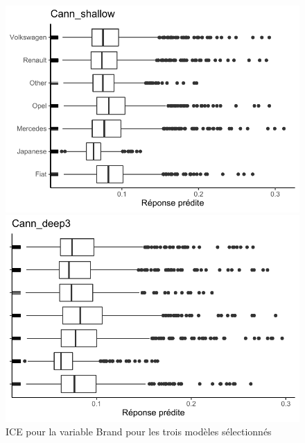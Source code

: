 \begin{figure}[b]
\begin{minipage}{0.45\linewidth}
\end{minipage}
\end{figure}

\begin{figure}[b]
\caption{\label{fig:ice3Brand} ICE pour la variable Brand pour les trois modèles sélectionnés}
\centering
\begin{minipage}{0.45\linewidth}
\includegraphics[scale=0.6]{Graphiques/iceBrandShallow}
\end{minipage}
\hfill
\begin{minipage}{0.45\linewidth}
\includegraphics[scale=0.6]{Graphiques/iceBrandCann}
\end{minipage}
\hfill
\begin{minipage}{0.45\linewidth}

\end{minipage}
\end{figure}
